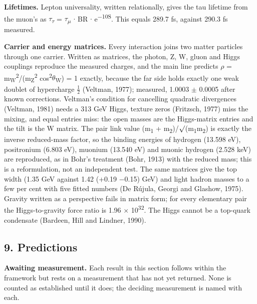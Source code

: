 \documentclass[
  11pt,
]{article}
\begin{document}
\textbf{Lifetimes.} Lepton universality, written relationally, gives the tau lifetime from the muon's as \ensuremath{\tau}\textsubscript{\ensuremath{\tau}} = \ensuremath{\tau}\textsubscript{\ensuremath{\mu}} \ensuremath{\cdot} BR \ensuremath{\cdot} e\textsuperscript{\ensuremath{-}10S}. This equals 289.7 fs, against 290.3 fs measured.

\textbf{Carrier and energy matrices.} Every interaction joins two matter particles through one carrier. Written as matrices, the photon, Z, W, gluon and Higgs couplings reproduce the measured charges, and the main line predicts \ensuremath{\rho} = m\textsubscript{W}\textsuperscript{2}/(m\textsubscript{Z}\textsuperscript{2} cos\textsuperscript{2}\ensuremath{\theta}\textsubscript{W}) = 1 exactly, because the far side holds exactly one weak doublet of hypercharge \ensuremath{\frac{1}{2}} (Veltman, 1977); measured, 1.0003 \ensuremath{\pm} 0.0005 after known corrections. Veltman's condition for cancelling quadratic divergences (Veltman, 1981) needs a 313 GeV Higgs, texture zeros (Fritzsch, 1977) miss the mixing, and equal entries miss: the open masses are the Higgs-matrix entries and the tilt is the W matrix. The pair link value (m\textsubscript{1} + m\textsubscript{2})/\ensuremath{\surd}(m\textsubscript{1}m\textsubscript{2}) is exactly the inverse reduced-mass factor, so the binding energies of hydrogen (13.598 eV), positronium (6.803 eV), muonium (13.540 eV) and muonic hydrogen (2.528 keV) are reproduced, as in Bohr's treatment (Bohr, 1913) with the reduced mass; this is a reformulation, not an independent test. The same matrices give the top width (1.35 GeV against 1.42 (+0.19 \ensuremath{-}0.15) GeV) and light hadron masses to a few per cent with five fitted numbers (De Rújula, Georgi and Glashow, 1975). Gravity written as a perspective fails in matrix form; for every elementary pair the Higgs-to-gravity force ratio is 1.96 \ensuremath{\times} 10\textsuperscript{32}. The Higgs cannot be a top-quark condensate (Bardeen, Hill and Lindner, 1990).

\hypertarget{predictions}{%
\subsection{9. Predictions}\label{predictions}}

\textbf{Awaiting measurement.} Each result in this section follows within the framework but rests on a measurement that has not yet returned. None is counted as established until it does; the deciding measurement is named with each.
\end{document}
